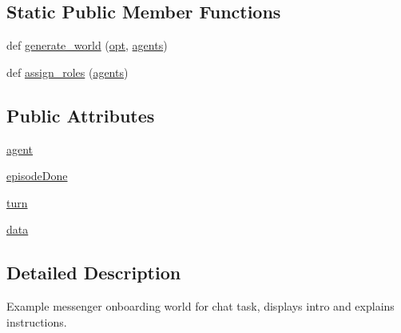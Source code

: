 \subsection*{Static Public Member Functions}
\begin{DoxyCompactItemize}
\item 
def \hyperlink{classparlai_1_1messenger_1_1tasks_1_1overworld__demo_1_1worlds_1_1MessengerChatOnboardWorld_a377d832676de84132471e8f2b9455fac}{generate\+\_\+world} (\hyperlink{classparlai_1_1core_1_1worlds_1_1World_a3640d92718acd3e6942a28c1ab3678bd}{opt}, \hyperlink{classparlai_1_1core_1_1worlds_1_1World_a728f75194cc26ea4035047c46cf62608}{agents})
\item 
def \hyperlink{classparlai_1_1messenger_1_1tasks_1_1overworld__demo_1_1worlds_1_1MessengerChatOnboardWorld_a8fbb2fb564dd0502d18d77ce1de19287}{assign\+\_\+roles} (\hyperlink{classparlai_1_1core_1_1worlds_1_1World_a728f75194cc26ea4035047c46cf62608}{agents})
\end{DoxyCompactItemize}
\subsection*{Public Attributes}
\begin{DoxyCompactItemize}
\item 
\hyperlink{classparlai_1_1messenger_1_1tasks_1_1overworld__demo_1_1worlds_1_1MessengerChatOnboardWorld_ae99673acdcb2895473f747dbc433c874}{agent}
\item 
\hyperlink{classparlai_1_1messenger_1_1tasks_1_1overworld__demo_1_1worlds_1_1MessengerChatOnboardWorld_a402b2140631c7d30767873c1125842b6}{episode\+Done}
\item 
\hyperlink{classparlai_1_1messenger_1_1tasks_1_1overworld__demo_1_1worlds_1_1MessengerChatOnboardWorld_a1c12c2edab53bc4139fbd120b7ccfb29}{turn}
\item 
\hyperlink{classparlai_1_1messenger_1_1tasks_1_1overworld__demo_1_1worlds_1_1MessengerChatOnboardWorld_a9b27859dcdc31344fba8c6079bf3cd3c}{data}
\end{DoxyCompactItemize}


\subsection{Detailed Description}
\begin{DoxyVerb}Example messenger onboarding world for chat task, displays intro and
explains instructions.
\end{DoxyVerb}
 

